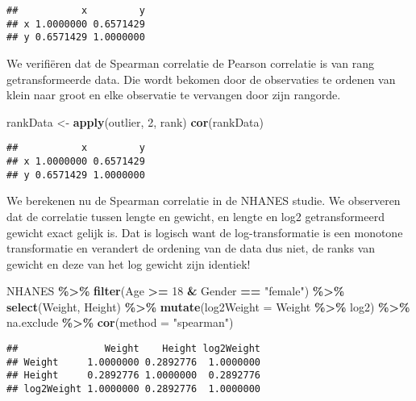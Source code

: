 \documentclass[
  12pt,dutch,coursenotes]{book}
\newenvironment{Shaded}{\begin{snugshade}}{\end{snugshade}}
\newcommand{\DataTypeTok}[1]{\textcolor[rgb]{0.13,0.29,0.53}{#1}}
\newcommand{\DecValTok}[1]{\textcolor[rgb]{0.00,0.00,0.81}{#1}}
\newcommand{\KeywordTok}[1]{\textcolor[rgb]{0.13,0.29,0.53}{\textbf{#1}}}
\newcommand{\NormalTok}[1]{#1}
\newcommand{\OperatorTok}[1]{\textcolor[rgb]{0.81,0.36,0.00}{\textbf{#1}}}
\newcommand{\StringTok}[1]{\textcolor[rgb]{0.31,0.60,0.02}{#1}}
\theoremstyle{definition}
\theoremstyle{definition}
\theoremstyle{definition}
\theoremstyle{remark}
\begin{document}
\begin{verbatim}
##           x         y
## x 1.0000000 0.6571429
## y 0.6571429 1.0000000
\end{verbatim}

We verifiëren dat de Spearman correlatie de Pearson correlatie is van rang getransformeerde data. Die wordt bekomen door de observaties te ordenen van klein naar groot en elke observatie te vervangen door zijn rangorde.

\begin{Shaded}
\begin{Highlighting}[]
\NormalTok{rankData \textless{}{-}}\StringTok{ }\KeywordTok{apply}\NormalTok{(outlier, }\DecValTok{2}\NormalTok{, rank)}
\KeywordTok{cor}\NormalTok{(rankData)}
\end{Highlighting}
\end{Shaded}

\begin{verbatim}
##           x         y
## x 1.0000000 0.6571429
## y 0.6571429 1.0000000
\end{verbatim}

We berekenen nu de Spearman correlatie in de NHANES studie.
We observeren dat de correlatie tussen lengte en gewicht, en lengte en log2 getransformeerd gewicht exact gelijk is.
Dat is logisch want de log-transformatie is een monotone transformatie en verandert de ordening van de data dus niet, de ranks van gewicht en deze van het log gewicht zijn identiek!

\begin{Shaded}
\begin{Highlighting}[]
\NormalTok{NHANES }\OperatorTok{\%\textgreater{}\%}\StringTok{ }\KeywordTok{filter}\NormalTok{(Age }\OperatorTok{\textgreater{}=}\StringTok{ }\DecValTok{18} \OperatorTok{\&}\StringTok{ }\NormalTok{Gender }\OperatorTok{==}\StringTok{ "female"}\NormalTok{) }\OperatorTok{\%\textgreater{}\%}\StringTok{ }
\StringTok{    }\KeywordTok{select}\NormalTok{(Weight, Height) }\OperatorTok{\%\textgreater{}\%}\StringTok{ }\KeywordTok{mutate}\NormalTok{(}\DataTypeTok{log2Weight =}\NormalTok{ Weight }\OperatorTok{\%\textgreater{}\%}\StringTok{ }
\StringTok{    }\NormalTok{log2) }\OperatorTok{\%\textgreater{}\%}\StringTok{ }\NormalTok{na.exclude }\OperatorTok{\%\textgreater{}\%}\StringTok{ }\KeywordTok{cor}\NormalTok{(}\DataTypeTok{method =} \StringTok{"spearman"}\NormalTok{)}
\end{Highlighting}
\end{Shaded}

\begin{verbatim}
##               Weight    Height log2Weight
## Weight     1.0000000 0.2892776  1.0000000
## Height     0.2892776 1.0000000  0.2892776
## log2Weight 1.0000000 0.2892776  1.0000000
\end{verbatim}
\end{document}
